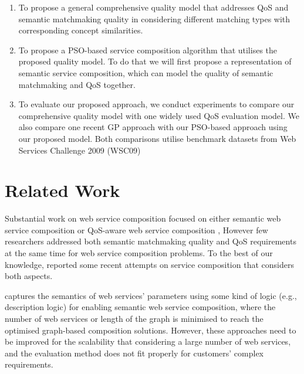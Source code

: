 \documentclass{llncs}
\begin{document}
\begin{enumerate}
 \item To propose a general comprehensive quality model that addresses QoS and semantic matchmaking quality in considering different matching types with corresponding concept similarities.
  
 \item To propose a PSO-based service composition algorithm that utilises the proposed quality model. To do that we will first propose a representation of semantic service composition, which can model the quality of semantic matchmaking and QoS together.
  
 \item To evaluate our proposed approach, we conduct experiments to compare our comprehensive quality model with one widely used QoS evaluation model. We also compare one recent GP approach \cite{ma2015hybrid} with our PSO-based approach using our proposed model. Both comparisons utilise benchmark datasets from Web Services Challenge 2009 (WSC09) \cite{kona2009wsc} 
  
\end{enumerate}

\section{Related Work} \label{relatedWork}
Substantial work on web service composition focused on either semantic web service composition \cite{boustil2014semantic,bansal2016generalized,mier2015integrated} or QoS-aware web service composition \cite{gupta2015optimization,qi2010combining,ma2015hybrid,da2016particle,da2015graphevol,yu2013adaptive}, However few researchers addressed both semantic matchmaking quality and QoS requirements at the same time for web service composition problems. To the best of our knowledge, \cite{fanjiang2014semantic,lecue2009optimizing,pop2009immune} reported some recent attempts on service composition that considers both aspects.

\cite{boustil2014semantic,bansal2016generalized,mier2015integrated} captures the semantics of web services' parameters using some kind of logic (e.g., description logic) for enabling semantic web service composition, where the number of web services or length of the graph is minimised to reach the optimised graph-based composition solutions. However, these approaches need to be improved for the scalability that considering a large number of web services, and the evaluation method does not fit properly for customers' complex requirements.
\end{document}
